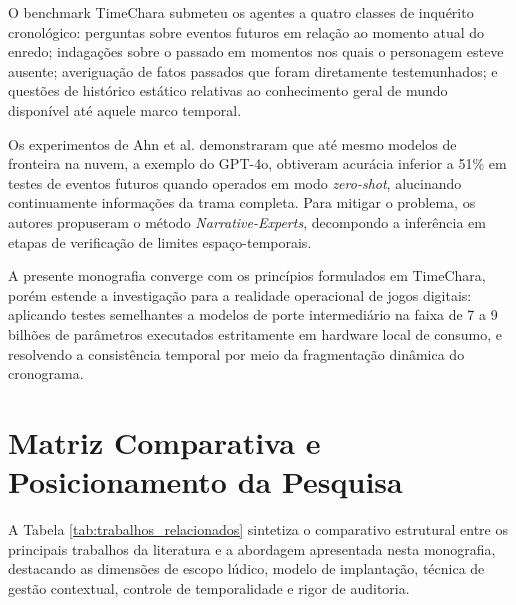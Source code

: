 O benchmark TimeChara submeteu os agentes a quatro classes de inquérito cronológico: perguntas sobre eventos futuros em relação ao momento atual do enredo; indagações sobre o passado em momentos nos quais o personagem esteve ausente; averiguação de fatos passados que foram diretamente testemunhados; e questões de histórico estático relativas ao conhecimento geral de mundo disponível até aquele marco temporal.

Os experimentos de Ahn et al. \cite{ahn2024timechara} demonstraram que até mesmo modelos de fronteira na nuvem, a exemplo do GPT-4o, obtiveram acurácia inferior a 51\% em testes de eventos futuros quando operados em modo \textit{zero-shot}, alucinando continuamente informações da trama completa. Para mitigar o problema, os autores propuseram o método \textit{Narrative-Experts}, decompondo a inferência em etapas de verificação de limites espaço-temporais.

A presente monografia converge com os princípios formulados em TimeChara, porém estende a investigação para a realidade operacional de jogos digitais: aplicando testes semelhantes a modelos de porte intermediário na faixa de 7 a 9 bilhões de parâmetros executados estritamente em hardware local de consumo, e resolvendo a consistência temporal por meio da fragmentação dinâmica do cronograma.

\section{Matriz Comparativa e Posicionamento da Pesquisa}
\label{sec:rel_matriz}

A Tabela \ref{tab:trabalhos_relacionados} sintetiza o comparativo estrutural entre os principais trabalhos da literatura e a abordagem apresentada nesta monografia, destacando as dimensões de escopo lúdico, modelo de implantação, técnica de gestão contextual, controle de temporalidade e rigor de auditoria.

